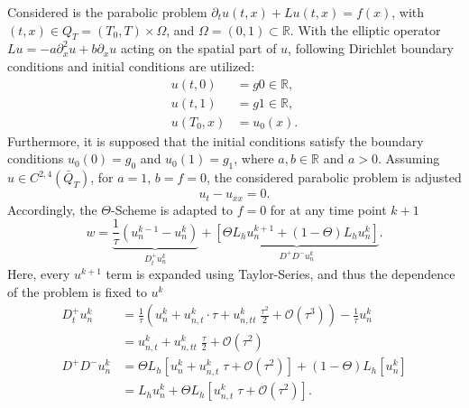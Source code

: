 \newcommand{\assignmentDate}{December 15th, 2019}



Considered is the parabolic problem	$\partial_t u(t,x) + L u(t,x) = f(x)$, with $(t,x) \in Q_T = (T_0, T) \times \Omega$, and $\Omega = (0,1) \subset \mathbb{R}$.
With the elliptic operator $Lu = -a\partial_x^2 u + b \partial_x u$ acting on the spatial part of $u$, following Dirichlet boundary conditions and initial conditions are utilized:
\begin{align*}
	u(t,0) &= g0 \in \mathbb{R} \text{,} \\
	u(t,1) &= g1 \in \mathbb{R} \text{,} \\
	u(T_0,x) &= u_0(x)	 		\text{.}
\end{align*}
Furthermore, it is supposed that the initial conditions satisfy the boundary conditions $u_0(0) = g_0$ and $u_0(1) = g_1$, where $a,b \in \mathbb{R}$ and $a>0$.
%
Assuming $u \in C^{2,4}(\bar{Q}_T)$, for $a = 1$, $b = f = 0$, the considered parabolic problem is adjusted
\begin{equation}
	\label{eq:PDE}
	u_t - u_{xx} = 0 \text{.}
\end{equation}
Accordingly, the $\Theta$-Scheme is adapted to $f = 0$ for at any time point $k + 1$
\begin{equation}
	w = \underbrace{\frac{1}{\tau} \left( u_n^{k-1} - u_n^k \right)}_{D_t^+ u^k_n }+ \underbrace{\left[\Theta L_h u_n^{k + 1} + (1 - \Theta) L_h u_n^k\right]}_{D^+D^- u^k_n} \text{.}
\end{equation}
Here, every $u^{k + 1}$ term is expanded using Taylor-Series, and thus the dependence of the problem is fixed to $u^k$
\begin{align}
	\nonumber
	D_t^+ u^k_n  &= \frac{1}{\tau} \left( u^k_n + u^k_{n,t} \cdot \tau + u^k_{n,tt} \; \frac{\tau^2}{2} + \mathcal{O}(\tau^3)  \right) -\frac{1}{\tau} u_n^k \\
	\label{eq:Dt_2}
				 &= u^k_{n,t} + u^k_{n,tt} \; \frac{\tau}{2} + \mathcal{O}(\tau^2) 													  \\
	\nonumber
	D^+D^- u^k_n &= \Theta L_h \left[ u^k_n + u^k_{n,t} \; \tau + \mathcal{O}(\tau^2) \right] + (1-\Theta) L_h \left[ u^k_n \right] \\
	\label{eq:Dxx_2}
				 &=L_h u^k_n + \Theta L_h \left[ u^k_{n,t} \; \tau + \mathcal{O}(\tau^2) \right] \text{.}
\end{align}
